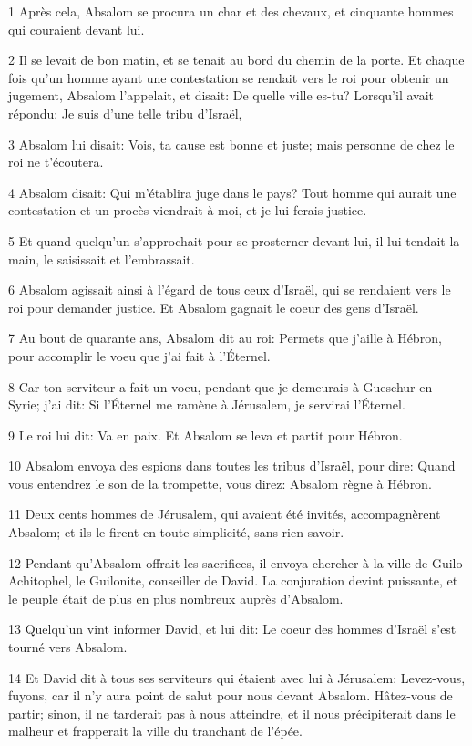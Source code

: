 \par 1 Après cela, Absalom se procura un char et des chevaux, et cinquante hommes qui couraient devant lui.
\par 2 Il se levait de bon matin, et se tenait au bord du chemin de la porte. Et chaque fois qu'un homme ayant une contestation se rendait vers le roi pour obtenir un jugement, Absalom l'appelait, et disait: De quelle ville es-tu? Lorsqu'il avait répondu: Je suis d'une telle tribu d'Israël,
\par 3 Absalom lui disait: Vois, ta cause est bonne et juste; mais personne de chez le roi ne t'écoutera.
\par 4 Absalom disait: Qui m'établira juge dans le pays? Tout homme qui aurait une contestation et un procès viendrait à moi, et je lui ferais justice.
\par 5 Et quand quelqu'un s'approchait pour se prosterner devant lui, il lui tendait la main, le saisissait et l'embrassait.
\par 6 Absalom agissait ainsi à l'égard de tous ceux d'Israël, qui se rendaient vers le roi pour demander justice. Et Absalom gagnait le coeur des gens d'Israël.
\par 7 Au bout de quarante ans, Absalom dit au roi: Permets que j'aille à Hébron, pour accomplir le voeu que j'ai fait à l'Éternel.
\par 8 Car ton serviteur a fait un voeu, pendant que je demeurais à Gueschur en Syrie; j'ai dit: Si l'Éternel me ramène à Jérusalem, je servirai l'Éternel.
\par 9 Le roi lui dit: Va en paix. Et Absalom se leva et partit pour Hébron.
\par 10 Absalom envoya des espions dans toutes les tribus d'Israël, pour dire: Quand vous entendrez le son de la trompette, vous direz: Absalom règne à Hébron.
\par 11 Deux cents hommes de Jérusalem, qui avaient été invités, accompagnèrent Absalom; et ils le firent en toute simplicité, sans rien savoir.
\par 12 Pendant qu'Absalom offrait les sacrifices, il envoya chercher à la ville de Guilo Achitophel, le Guilonite, conseiller de David. La conjuration devint puissante, et le peuple était de plus en plus nombreux auprès d'Absalom.
\par 13 Quelqu'un vint informer David, et lui dit: Le coeur des hommes d'Israël s'est tourné vers Absalom.
\par 14 Et David dit à tous ses serviteurs qui étaient avec lui à Jérusalem: Levez-vous, fuyons, car il n'y aura point de salut pour nous devant Absalom. Hâtez-vous de partir; sinon, il ne tarderait pas à nous atteindre, et il nous précipiterait dans le malheur et frapperait la ville du tranchant de l'épée.
